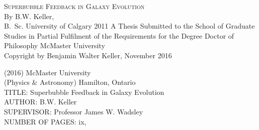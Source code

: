 \documentclass[letterpaper,12pt,twoside,openright]{report} %
\begin{document}
\begin{titlepage} %
\thispagestyle{empty}
\centering
\vspace*{\fill} %
{\Large \textsc{Superbubble Feedback in Galaxy Evolution}\\
\vfill
    By {\sc B.W. Keller}, \\
    B.\ Sc. University of Calgary 2011}
\vfill
A Thesis Submitted to the School of Graduate Studies in Partial Fulfilment of
the Requirements for the Degree Doctor of Philosophy
\vfill%
McMaster University \\ \textcopyright{} Copyright by Benjamin Walter Keller, November 2016
\end{titlepage}
{ (2016) \hfill McMaster University \\
(Physics \& Astronomy) \hfill Hamilton, Ontario \\
TITLE: Superbubble Feedback in Galaxy Evolution\\
AUTHOR: B.W. Keller\\
SUPERVISOR: Professor James W. Wadsley\\
NUMBER OF PAGES: ix,~\pageref{LastPage}}
\end{document}
